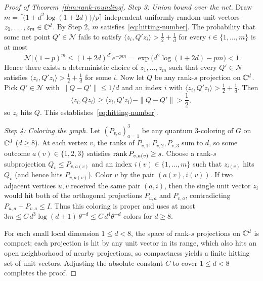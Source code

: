 \begin{proof}[Proof of Theorem~\ref{thm:rank-rounding}]
\emph{Step 3: Union bound over the net.} Draw $m=\bigl\lceil\bigl(1+d^2\log(1+2d)\bigr)/p\bigr\rceil$ independent uniformly random unit vectors $z_1,\ldots,z_m\in\mathbb C^d$. By Step 2, $m$ satisfies~\eqref{eq:hitting-number}. The probability that some net point $Q'\in\mathcal N$ fails to satisfy $\langle z_i,Q'z_i\rangle>\tfrac12+\tfrac1d$ for every $i\in\{1,\ldots,m\}$ is at most
\[
 |\mathcal N|(1-p)^m\le (1+2d)^{d^2}e^{-pm}=\exp\!\bigl(d^2\log(1+2d)-pm\bigr)<1.
\]
Hence there exists a deterministic choice of $z_1,\ldots,z_m$ such that every $Q'\in\mathcal N$ satisfies $\langle z_i,Q'z_i\rangle>\tfrac12+\tfrac1d$ for some $i$. Now let $Q$ be any rank-$s$ projection on $\mathbb C^d$. Pick $Q'\in\mathcal N$ with $\|Q-Q'\|\le1/d$ and an index $i$ with $\langle z_i,Q'z_i\rangle>\tfrac12+\tfrac1d$. Then
\[
 \langle z_i,Qz_i\rangle\ge \langle z_i,Q'z_i\rangle-\|Q-Q'\|>\frac12,
\]
so $z_i$ hits $Q$. This establishes~\eqref{eq:hitting-number}.

\emph{Step 4: Coloring the graph.} Let $(P_{v,a})_{a=1}^3$ be any quantum $3$-coloring of $G$ on $\mathbb C^d$ ($d\ge8$). At each vertex $v$, the ranks of $P_{v,1},P_{v,2},P_{v,3}$ sum to $d$, so some outcome $a(v)\in\{1,2,3\}$ satisfies $\operatorname{rank} P_{v,a(v)}\ge s$. Choose a rank-$s$ subprojection $Q_v\le P_{v,a(v)}$ and an index $i(v)\in\{1,\ldots,m\}$ such that $z_{i(v)}$ hits $Q_v$ (and hence hits $P_{v,a(v)}$). Color $v$ by the pair $(a(v),i(v))$. If two adjacent vertices $u,v$ received the same pair $(a,i)$, then the single unit vector $z_i$ would hit both of the orthogonal projections $P_{u,a}$ and $P_{v,a}$, contradicting $P_{u,a}+P_{v,a}\le I$. Thus this coloring is proper and uses at most $3m\le C\,d^3\log(d+1)\,\theta^{-d}\le C\,d^4\theta^{-d}$ colors for $d\ge8$.

For each small local dimension $1\le d<8$, the space of rank-$s$ projections on $\mathbb C^d$ is compact; each projection is hit by any unit vector in its range, which also hits an open neighborhood of nearby projections, so compactness yields a finite hitting set of unit vectors. Adjusting the absolute constant $C$ to cover $1\le d<8$ completes the proof.
\end{proof}

